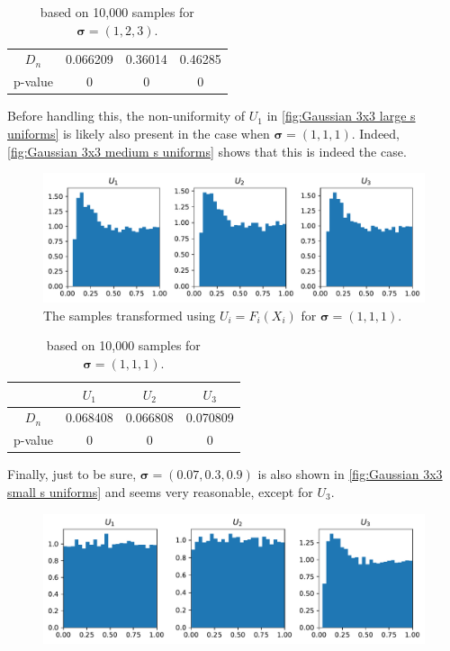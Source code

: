 \documentclass[../Thesis.tex]{subfiles}
\begin{document}
\begin{example}
\begin{table}[h]
\begin{tabular}{c|c|c|c}
            $D_n$   & 0.066209 & 0.36014 & 0.46285 \\
            p-value & 0        & 0       & 0
        \end{tabular}
        \caption{based on 10,000 samples for $\boldsymbol\sigma = (1, 2, 3)$.}
    \end{table}
    Before handling this, the non-uniformity of $U_1$ in \autoref{fig:Gaussian 3x3 large s uniforms} is likely also present in the case when $\boldsymbol\sigma = (1,1,1)$. Indeed, \autoref{fig:Gaussian 3x3 medium s uniforms} shows that this is indeed the case.
    \begin{figure}[H]
        \centering
        \includegraphics[width=0.99\linewidth]{figures/ND examples/Gaussian 3x3 medium s uniforms.pdf}
        \caption{The samples transformed using $U_i = F_i(X_i)$ for $\boldsymbol\sigma = (1,1,1)$.}
        \label{fig:Gaussian 3x3 medium s uniforms}
    \end{figure}
    \begin{table}[h]
        \centering
        \begin{tabular}{c|c|c|c}
                    & $U_1$    & $U_2$    & $U_3$    \\\hline
            $D_n$   & 0.068408 & 0.066808 & 0.070809 \\
            p-value & 0        & 0        & 0
        \end{tabular}
        \caption{based on 10,000 samples for $\boldsymbol\sigma = (1, 1, 1)$.}
    \end{table}
    Finally, just to be sure, $\boldsymbol\sigma = (0.07, 0.3, 0.9)$ is also shown in \autoref{fig:Gaussian 3x3 small s uniforms} and seems very reasonable, except for $U_3$.
    \begin{figure}[H]
        \centering
        \includegraphics[width=0.99\linewidth]{figures/ND examples/Gaussian 3x3 small s uniforms.pdf}

\end{figure}
\end{example}
\end{document}
